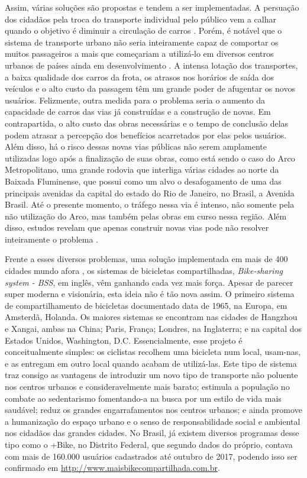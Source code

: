 \par Assim, várias soluções são propostas e tendem a ser implementadas. A persuação dos cidadãos pela troca do transporte individual pelo público vem a calhar quando o objetivo é diminuir a circulação de carros \citep{site:7}. Porém, é notável que o sistema de transporte urbano não seria inteiramente capaz de comportar os muitos passageiros a mais que começariam a utilizá-lo em diversos centros urbanos de países ainda em desenvolvimento \citep{site:8}. A intensa lotação dos transportes, a baixa qualidade dos carros da frota, os atrasos nos horários de saída dos veículos e o alto custo da passagem têm um grande poder de afugentar os novos usuários. Felizmente, outra medida para o problema seria o aumento da capacidade de carros das vias já construídas e a construção de novas. Em contrapartida, o alto custo das obras necessárias e o tempo de conclusão delas podem atrasar a percepção dos benefícios acarretados por elas pelos usuários. Além disso, há o risco dessas novas vias públicas não serem amplamente utilizadas logo após a finalização de suas obras, como está sendo o caso do Arco Metropolitano, uma grande rodovia que interliga várias cidades ao norte da Baixada Fluminense, que possui como um alvo o desafogamento de uma das principais avenidas da capital do estado do Rio de Janeiro, no Brasil, a Avenida Brasil. Até o presente momento, o tráfego nessa via é intenso, não somente pela não utilização do Arco, mas também pelas obras em curso nessa região. Além disso, estudos revelam que apenas construir novas vias pode não resolver inteiramente o problema \citep{site:9}.

\par Frente a esses diversos problemas, uma solução implementada em mais de 400 cidades mundo afora \citep{book:1}, os sistemas de bicicletas compartilhadas, \textit{Bike-sharing system - BSS}, em inglês, vêm ganhando cada vez mais força. Apesar de parecer super moderna e visionária, esta ideia não é tão nova assim. O primeiro sistema de compartilhamento de bicicletas documentado data de 1965, na Europa, em Amsterdã, Holanda. Os maiores sistemas se encontram nas cidades de Hangzhou e Xangai, ambas na China; Paris, França; Londres, na Inglaterra; e na capital dos Estados Unidos, Washington, D.C. Essencialmente, esse projeto é conceitualmente simples: os ciclistas recolhem uma bicicleta num local, usam-nas, e as entregam em outro local quando acabam de utilizá-las. Este tipo de sistema traz consigo as vantagens de introduzir um novo tipo de transporte não poluente nos centros urbanos e consideravelmente mais barato; estimula a população no combate ao sedentarismo fomentando-a na busca por um estilo de vida mais saudável; reduz os grandes engarrafamentos nos centros urbanos; e ainda promove a humanização do espaço urbano e o senso de responsabilidade social e ambiental nos cidadãos das grandes cidades. No Brasil, já existem diversos programas desse tipo como o +Bike, no Distrito Federal, que segundo dados do próprio, contava com mais de 160.000 usuários cadastrados até outubro de 2017, podendo isso ser confirmado em \url{http://www.maisbikecompartilhada.com.br}. 


